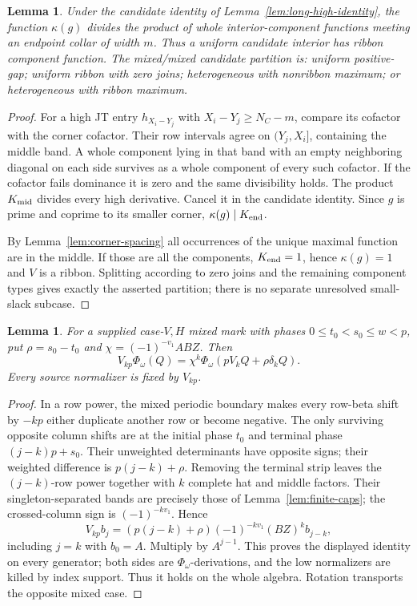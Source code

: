 \documentclass[11pt,a4paper]{amsart}
\numberwithin{equation}{section}
\theoremstyle{plain}
\newtheorem{lemma}[theorem]{Lemma}
\theoremstyle{definition}
\begin{document}
\begin{lemma}\label{lem:endpoint-ancestry}
Under the candidate identity of Lemma~\ref{lem:long-high-identity}, the function \(\kappa(g)\) divides the product of whole interior-component functions meeting an endpoint collar of width \(m\).  Thus a uniform candidate interior has ribbon component function.  The mixed/mixed candidate partition is: uniform positive-gap; uniform ribbon with zero joins; heterogeneous with nonribbon maximum; or heterogeneous with ribbon maximum.
\end{lemma}
\begin{proof}
For a high JT entry \(h_{X_i-Y_j}\) with \(X_i-Y_j\ge N_C-m\), compare its cofactor with the corner cofactor.  Their row intervals agree on \((Y_j,X_i]\), containing the middle band.  A whole component lying in that band with an empty neighboring diagonal on each side survives as a whole component of every such cofactor.  If the cofactor fails dominance it is zero and the same divisibility holds.  The product \(K_{\rm mid}\) divides every high derivative.  Cancel it in the candidate identity.  Since \(g\) is prime and coprime to its smaller corner, \(\kappa(g)\mid K_{\rm end}\).

By Lemma~\ref{lem:corner-spacing} all occurrences of the unique maximal function are in the middle.  If those are all the components, \(K_{\rm end}=1\), hence \(\kappa(g)=1\) and \(V\) is a ribbon.  Splitting according to zero joins and the remaining component types gives exactly the asserted partition; there is no separate unresolved small-slack subcase.
\end{proof}

\begin{lemma}\label{lem:mixed-covariance}
For a supplied case-\(V,H\) mixed mark with phases \(0\le t_0<s_0\le w<p\), put \(\rho=s_0-t_0\) and \(\chi=(-1)^{-v_1}ABZ\).  Then
\[
 V_{kp}\Phi_\omega(Q)=\chi^k\Phi_\omega(pV_kQ+\rho\delta_kQ).
\]
Every source normalizer is fixed by \(V_{kp}\).
\end{lemma}
\begin{proof}
In a row power, the mixed periodic boundary makes every row-beta shift by \(-kp\) either duplicate another row or become negative.  The only surviving opposite column shifts are at the initial phase \(t_0\) and terminal phase \((j-k)p+s_0\).  Their unweighted determinants have opposite signs; their weighted difference is \(p(j-k)+\rho\).  Removing the terminal strip leaves the \((j-k)\)-row power together with \(k\) complete hat and middle factors.  Their singleton-separated bands are precisely those of Lemma~\ref{lem:finite-caps}; the crossed-column sign is \((-1)^{-kv_1}\).  Hence
\[
 V_{kp}b_j=(p(j-k)+\rho)(-1)^{-kv_1}(BZ)^kb_{j-k},
\]
including \(j=k\) with \(b_0=A\).  Multiply by \(A^{j-1}\).  This proves the displayed identity on every generator; both sides are \(\Phi_\omega\)-derivations, and the low normalizers are killed by index support.  Thus it holds on the whole algebra.  Rotation transports the opposite mixed case.
\end{proof}
\end{document}
